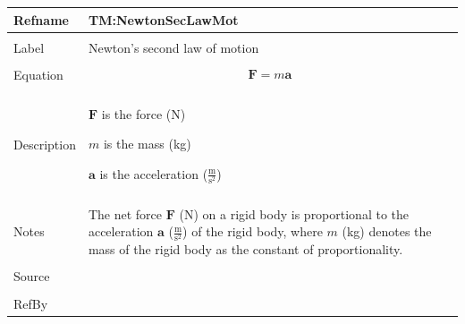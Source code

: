 \documentclass[12pt]{article}
\begin{document}
\noindent \begin{minipage}{\textwidth}
\begin{tabular}{p{} p{}}
\toprule \textbf{Refname} & \textbf{TM:NewtonSecLawMot}
\label{TM:NewtonSecLawMot}
\\ \midrule \\
Label & Newton's second law of motion
        \\ \midrule \\
        Equation & \begin{displaymath}
                   \mathbf{F}=m \mathbf{a}
                   \end{displaymath}
                   \\ \midrule \\
                   Description & \begin{symbDescription}
                                 \item{$\mathbf{F}$ is the force (N)}
                                 \item{$m$ is the mass (kg)}
                                 \item{$\mathbf{a}$ is the acceleration ($\frac{\text{m}}{\text{s}^{2}}$)}
                                 \end{symbDescription}
                                 \\ \midrule \\
                                 Notes & The net force $\mathbf{F}$ (N) on a rigid body is proportional to the acceleration $\mathbf{a}$ ($\frac{\text{m}}{\text{s}^{2}}$) of the rigid body, where $m$ (kg) denotes the mass of the rigid body as the constant of proportionality.
                                         \\ \midrule \\
                                         Source & \\ \midrule \\
                                                  RefBy & 
\\ \bottomrule \end{tabular}
\end{minipage}
\par~
\end{document}
